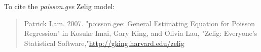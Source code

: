 To cite the \emph{ poisson.gee } Zelig model:
 \begin{verse}
 Patrick Lam. 2007. "poisson.gee: General Estimating Equation for Poisson Regression" in Kosuke Imai, Gary King, and Olivia Lau, "Zelig: Everyone's Statistical Software,"\url{http://gking.harvard.edu/zelig} 
\end{verse}